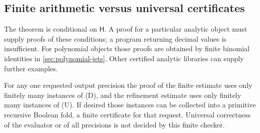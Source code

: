 \subsection{Finite arithmetic versus universal certificates}

The theorem is conditional on $\mathsf H$. A proof for a particular analytic
object must supply proofs of these conditions; a program returning decimal
values is insufficient. For polynomial objects those proofs are obtained
by finite binomial identities in \cref{sec:polynomial-jets}. Other certified
analytic libraries can supply further examples.

For any one requested output precision the proof of the finite estimate uses
only finitely many instances of (D), and the refinement estimate uses only
finitely many instances of (U). If desired those instances can be collected
into a primitive recursive Boolean fold, a finite certificate for that
request. Universal correctness of the evaluator or of all precisions is
not decided by this finite checker.
